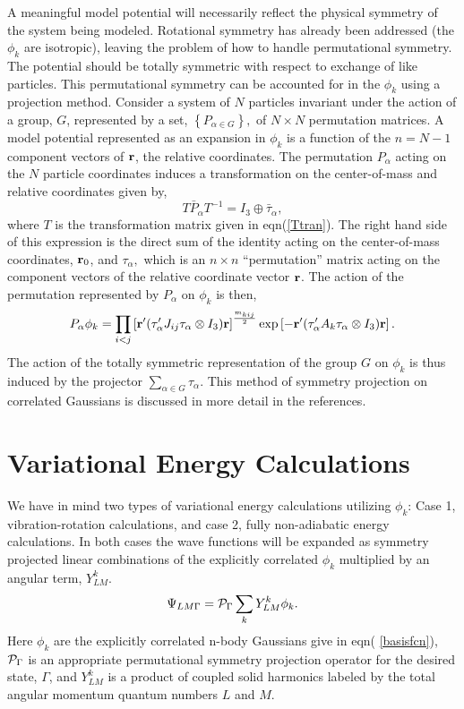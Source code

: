 A meaningful model potential will necessarily reflect the physical symmetry
of the system being modeled. Rotational symmetry has already been addressed
(the $\phi _k$ are isotropic), leaving the problem of how to handle
permutational symmetry. The potential should be totally symmetric with
respect to exchange of like particles. This permutational symmetry can be
accounted for in the $\phi _k$ using a projection method. Consider a system
of $N$ particles invariant under the action of a group, $G$, represented by
a set, $\left\{ P_{\alpha \in G}\right\} ,$ of $N\times N$ permutation
matrices. A model potential represented as an expansion in $\phi _k$ is a
function of the $n=N-1$ component vectors of ${\bf r}$, the relative
coordinates. The permutation $P_\alpha $ acting on the $N$ particle
coordinates induces a transformation on the center-of-mass and relative
coordinates given by, 
\begin{equation}
T\bar{P}_\alpha T^{-1}=I_3\oplus \bar{\tau}_\alpha ,
\end{equation}
where $T$ is the transformation matrix given in eqn(\ref{Ttran}). The right
hand side of this expression is the direct sum of the identity acting on the
center-of-mass coordinates, ${\bf r}_0$, and $\tau _\alpha ,$ which is an $%
n\times n$ ``permutation'' matrix acting on the component vectors of the
relative coordinate vector ${\bf r}$. The action of the permutation
represented by $P_\alpha $ on $\phi _k$ is then, 
\begin{equation}
P_\alpha \phi _k=\prod_{i<j}\left[ {\bf r}^{\prime }(\tau _\alpha ^{\prime
}J_{ij}\tau _\alpha \otimes I_3){\bf r}\right] ^{\frac{m_{kij}}2}\exp \left[
-{\bf r}^{\prime }(\tau _\alpha ^{\prime }A_k\tau _\alpha \otimes I_3){\bf r}%
\right] .
\end{equation}
The action of the totally symmetric representation of the group $G$ on $\phi
_k$ is thus induced by the projector $\sum_{\alpha \in G}\tau _\alpha .$
This method of symmetry projection on correlated Gaussians is discussed in
more detail in the references\cite{Poshusta83,Kinghorn93,Kinghorn95b}.

\section{Variational Energy Calculations}

We have in mind two types of variational energy calculations utilizing $\phi
_k$: Case 1, vibration-rotation calculations, and case 2, fully
non-adiabatic energy calculations. In both cases the wave functions will be
expanded as symmetry projected linear combinations of the explicitly
correlated $\phi _k$ multiplied by an angular term, $Y_{LM}^k.$ 
\begin{equation}
\Psi _{LM\Gamma }={\cal P}_\Gamma \sum_kY_{LM}^k\phi _k.  \label{wf}
\end{equation}
Here $\phi _k$ are the explicitly correlated n-body Gaussians give in eqn(%
\ref{basisfcn}), ${\cal P}_\Gamma $ is an appropriate permutational symmetry
projection operator for the desired state, $\Gamma $, and $Y_{LM}^k$ is a
product of coupled solid harmonics labeled by the total angular momentum
quantum numbers $L$ and $M$.


